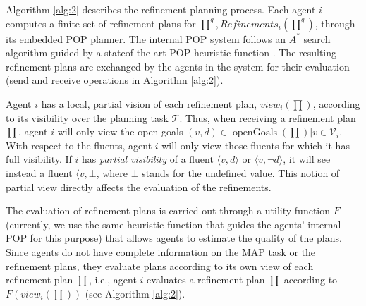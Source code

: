 \documentclass[12pt]{article}
\DeclareMathOperator{\openGoals}{openGoals}
\begin{document}
Algorithm \ref{alg:2} describes the refinement planning process.
Each agent $i$ computes a finite set of refinement plans for $\prod^g, Refinements_i(\prod^g)$, through its embedded POP planner.
The internal POP system follows an $A^\ast$ search algorithm guided by a stateof-the-art POP heuristic function \cite{Younes2003VHPOPVH}.
The resulting refinement plans are exchanged by the agents in the system for their evaluation (send and receive operations in Algorithm \ref{alg:2}).

Agent $i$ has a local, partial vision of each refinement plan, $view_i(\prod)$, according to its visibility over the planning task $\mathcal{T}$.
Thus, when receiving a refinement plan $\prod$, agent $i$ will only view the open goals $(v, d) \in \openGoals(\prod) | v \in \mathcal{V}_i$.
With respect to the fluents, agent $i$ will only view those fluents for which it has full visibility.
If $i$ has \textit{partial visibility} of a fluent $\langle v,d\rangle$ or $\langle v,\neg d\rangle$, it will see instead a fluent $\langle v,\bot$, where $\bot$ stands for the undefined value.
This notion of partial view directly affects the evaluation of the refinements.

The evaluation of refinement plans is carried out through a utility function $F$ (currently, we use the same heuristic function that guides the agents' internal POP for this purpose) that allows agents to estimate the quality of the plans.
Since agents do not have complete information on the MAP task or the refinement plans, they evaluate plans according to its own view of each refinement plan $\prod$, i.e., agent $i$ evaluates a refinement plan $\prod$ according to $F(view_i(\prod))$ (see Algorithm \ref{alg:2}).
\end{document}

